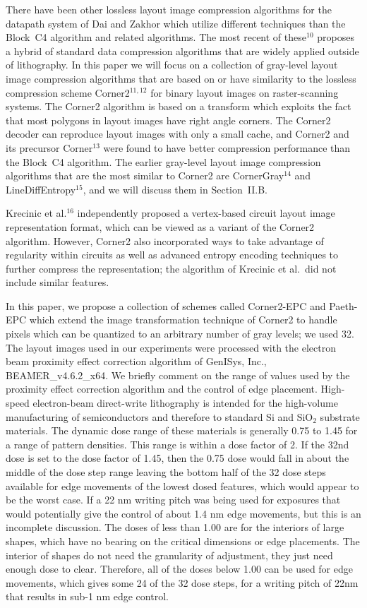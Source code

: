 \documentclass{article}
\begin{document}
There have been other lossless layout image compression algorithms
for the datapath system of Dai and Zakhor which utilize different techniques
than the Block~C4 algorithm and related algorithms.  
The most recent of these$^{10}$ proposes a hybrid of standard data compression
algorithms that are widely applied outside of lithography.
In this paper we will focus on a collection of gray-level layout image
compression algorithms that are based on or have similarity to the lossless
compression scheme Corner2$^{11,12}$ for binary layout images on 
raster-scanning systems.  The Corner2 algorithm is based on a transform which 
exploits the fact that most polygons in layout images have right angle 
corners. The Corner2 decoder can reproduce layout images with only a small 
cache, and Corner2 and its precursor Corner$^{13}$ were found to have better 
compression performance than the Block~C4 algorithm.  The earlier gray-level
layout image compression algorithms that are the most similar to Corner2
are CornerGray$^{14}$ and LineDiffEntropy$^{15}$, and we will discuss them
in Section~II.B.

Krecinic et al.$^{16}$ independently proposed a vertex-based circuit layout
image representation format, which can be viewed as a variant of the Corner2
algorithm.  However, Corner2 also incorporated ways to take advantage of
regularity within circuits as well as advanced entropy encoding techniques
to further compress the representation;  the algorithm of Krecinic et al.~did 
not include similar features.

In this paper, we propose a collection of schemes called Corner2-EPC 
and Paeth-EPC which
extend the image transformation technique of Corner2 to handle pixels which
can be quantized to an arbitrary number of gray levels; we used 32.
The layout images used in our experiments were processed with the electron 
beam proximity effect correction algorithm of GenISys, Inc.,
{\small BEAMER}\_v4.6.2\_x64.  We briefly comment on the range of values
used by the proximity effect correction algorithm and the control of edge
placement.  High-speed electron-beam direct-write lithography  is intended 
for the high-volume manufacturing of semiconductors and therefore to standard 
Si and SiO$_2$ substrate materials.  The dynamic dose range of these materials 
is generally 0.75 to 1.45 for a range of pattern densities.  This range is 
within a dose factor of 2.  If the 32nd dose is set to the dose factor of 
1.45, then the 0.75 dose would fall in about the middle of the dose step 
range leaving the bottom half of the 32 dose steps available for edge 
movements of the lowest dosed features, which would appear to be the worst 
case.  If a 22 nm writing pitch was being used for exposures that would 
potentially give the control of about 1.4 nm edge movements, but this is an
incomplete discussion.  The doses of less than 1.00 are for the interiors of 
large shapes, which have no bearing on the critical dimensions or edge
placements.  The interior of shapes do not need the granularity of adjustment,
they just need enough dose to clear.  Therefore, all of the doses below 1.00 
can be used for edge movements, which gives some 24 of the 32 dose steps, for 
a writing pitch of 22nm that results in sub-1 nm edge control.
\end{document}
